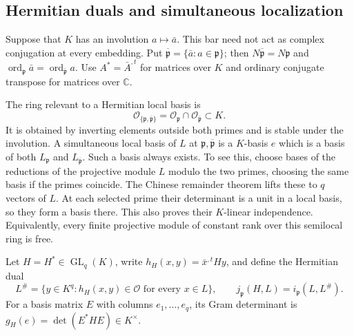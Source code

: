 \subsection{Hermitian duals and simultaneous localization}

Suppose that $K$ has an involution $a\mapsto\bar a$. This bar need not
act as complex conjugation at every embedding. Put
$\overline{\mathfrak p}=\{\bar a:a\in\mathfrak p\}$; then
$N\overline{\mathfrak p}=N\mathfrak p$ and
$\operatorname{ord}_{\mathfrak p}\bar a
 =\operatorname{ord}_{\overline{\mathfrak p}}a$.
Use $A^*=\bar A^{,t}$ for matrices over $K$ and ordinary conjugate
transpose for matrices over $\mathbb C$.

The ring relevant to a Hermitian local basis is
\[
 \mathcal O_{\{\mathfrak p,\overline{\mathfrak p}\}}
 =\mathcal O_{\mathfrak p}\cap
       \mathcal O_{\overline{\mathfrak p}}\subset K.
\]
It is obtained by inverting elements outside both primes and is stable
under the involution. A simultaneous local basis of $L$ at
$\mathfrak p,\overline{\mathfrak p}$ is a $K$-basis $e$ which is a basis
of both $L_{\mathfrak p}$ and $L_{\overline{\mathfrak p}}$.
Such a basis always exists. To see this, choose bases of the reductions
of the projective module $L$ modulo the two primes, choosing the same
basis if the primes coincide. The Chinese remainder theorem lifts these
to $q$ vectors of $L$. At each selected prime their determinant is a unit
in a local basis, so they form a basis there. This also proves their
$K$-linear independence. Equivalently, every finite projective module
of constant rank over this semilocal ring is free.

Let $H=H^*\in\operatorname{GL}_q(K)$, write
$h_H(x,y)=\bar x^{,t}Hy$, and define the Hermitian dual
\[
 L^\#=\{y\in K^q:h_H(x,y)\in\mathcal O\text{ for every }x\in L\},
 \qquad j_{\mathfrak p}(H,L)=i_{\mathfrak p}(L,L^\#).
\]
For a basis matrix $E$ with columns $e_1,\ldots,e_q$, its Gram
determinant is $g_H(e)=\det(E^*HE)\in K^\times$.

